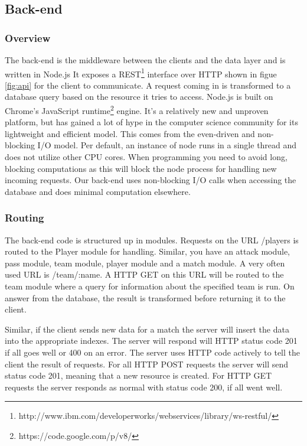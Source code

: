 \subsection{Back-end}

\subsubsection{Overview}	
The back-end is the middleware between the clients and the data layer and is written in Node.js\cite{node.js} It exposes a \ac{REST}\footnote{http://www.ibm.com/developerworks/webservices/library/ws-restful/} interface over \ac{HTTP} shown in figue \ref{fig:api} for the client to communicate. A request coming in is transformed to a database query based on the resource it tries to access. Node.js is built on Chrome’s JavaScript runtime\footnote{https://code.google.com/p/v8/} engine. It’s a relatively new and unproven platform, but has gained a lot of hype in the computer science community for its lightweight and efficient model. This comes from the even-driven and non-blocking I/O model. Per default, an instance of node runs in a single thread and does not utilize other CPU cores. When programming you need to avoid long, blocking computations as this will block the node process for handling new incoming requests. Our back-end uses non-blocking I/O calls when accessing the database and does minimal computation elsewhere. 

\subsubsection{Routing}

The back-end code is structured up in modules. Requests on the URL /players is routed to the Player module for handling. Similar, you have an attack module, pass module, team module, player module and a match module. A very often used URL is /team/:name. A \ac{HTTP} GET on this URL will be routed to the team module where a query for information about the specified team is run. On answer from the database, the result is transformed before returning it to the client. 

Similar, if the client sends new data for a match the server will insert the data into the appropriate indexes. The server will respond will HTTP status code 201 if all goes well or 400 on an error. The server uses \ac{HTTP} code actively to tell the client the result of requests. For all \ac{HTTP} POST requests the server will send status code 201, meaning that a new resource is created. For \ac{HTTP} GET requests the server responds as normal with status code 200, if all went well. 

